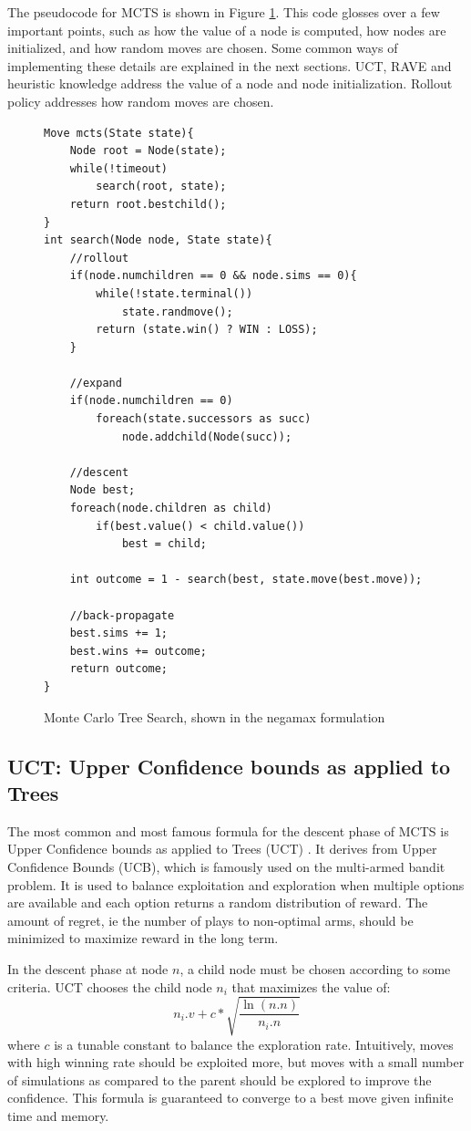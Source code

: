 The pseudocode for MCTS is shown in Figure \ref{fig:mctscode}. This code glosses over a few important points, such as how the value of a node is computed, how nodes are initialized, and how random moves are chosen. Some common ways of implementing these details are explained in the next sections. UCT, RAVE and heuristic knowledge address the value of a node and node initialization. Rollout policy addresses how random moves are chosen.

\begin{figure}

\begin{lstlisting}
Move mcts(State state){
	Node root = Node(state);
	while(!timeout)
		search(root, state);
	return root.bestchild();
}
int search(Node node, State state){
	//rollout
	if(node.numchildren == 0 && node.sims == 0){
		while(!state.terminal())
			state.randmove();
		return (state.win() ? WIN : LOSS);
	}

	//expand
	if(node.numchildren == 0)
		foreach(state.successors as succ)
			node.addchild(Node(succ));

	//descent
	Node best;
	foreach(node.children as child)
		if(best.value() < child.value())
			best = child;

	int outcome = 1 - search(best, state.move(best.move));

	//back-propagate
	best.sims += 1;
	best.wins += outcome;
	return outcome;
}
\end{lstlisting}

\caption{Monte Carlo Tree Search, shown in the negamax formulation}
\label{fig:mctscode}
\end{figure}


\subsection{UCT: Upper Confidence bounds as applied to Trees}\label{sec:uct}

The most common and most famous formula for the descent phase of MCTS is Upper Confidence bounds as applied to Trees (UCT) \cite{kocsis2006uct}. It derives from Upper Confidence Bounds (UCB), which is famously used on the multi-armed bandit problem. It is used to balance exploitation and exploration when multiple options are available and each option returns a random distribution of reward. The amount of regret, ie the number of plays to non-optimal arms, should be minimized to maximize reward in the long term.

In the descent phase at node $n$, a child node must be chosen according to some criteria. UCT chooses the child node $n_i$ that maximizes the value of:
\begin{equation}\label{eqn:uct} n_i.v + c*\sqrt{\frac{\ln(n.n)}{n_i.n}}\end{equation}
where $c$ is a tunable constant to balance the exploration rate. Intuitively, moves with high winning rate should be exploited more, but moves with a small number of simulations as compared to the parent should be explored to improve the confidence. This formula is guaranteed to converge to a best move given infinite time and memory.



